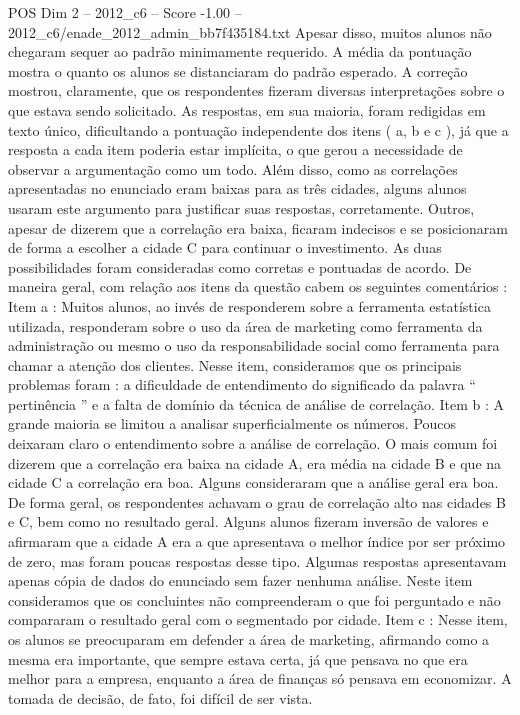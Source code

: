 \begin{textsample}{POS Dim 2 – 2012\_c6 – Score -1.00 – 2012\_c6/enade\_2012\_admin\_bb7f435184.txt}
Apesar disso, muitos alunos não chegaram sequer ao padrão minimamente requerido.
A média da pontuação mostra o quanto os alunos se distanciaram do padrão esperado.
A correção mostrou, claramente, que os respondentes fizeram diversas interpretações sobre o que estava sendo solicitado.
As respostas, em sua maioria, foram redigidas em texto único, dificultando a pontuação independente dos itens ( a, b e c ), já que a resposta a cada item poderia estar implícita, o que gerou a necessidade de observar a argumentação como um todo.
Além disso, como as correlações apresentadas no enunciado eram baixas para as três cidades, alguns alunos usaram este argumento para justificar suas respostas, corretamente.
Outros, apesar de dizerem que a correlação era baixa, ficaram indecisos e se posicionaram de forma a escolher a cidade C para continuar o investimento.
As duas possibilidades foram consideradas como corretas e pontuadas de acordo.
De maneira geral, com relação aos itens da questão cabem os seguintes comentários : Item a : Muitos alunos, ao invés de responderem sobre a ferramenta estatística utilizada, responderam sobre o uso da área de marketing como ferramenta da administração ou mesmo o uso da responsabilidade social como ferramenta para chamar a atenção dos clientes.
Nesse item, consideramos que os principais problemas foram : a dificuldade de entendimento do significado da palavra “ pertinência ” e a falta de domínio da técnica de análise de correlação.
Item b : A grande maioria se limitou a analisar superficialmente os números.
Poucos deixaram claro o entendimento sobre a análise de correlação.
O mais comum foi dizerem que a correlação era baixa na cidade A, era média na cidade B e que na cidade C a correlação era boa.
Alguns consideraram que a análise geral era boa.
De forma geral, os respondentes achavam o grau de correlação alto nas cidades B e C, bem como no resultado geral.
Alguns alunos fizeram inversão de valores e afirmaram que a cidade A era a que apresentava o melhor índice por ser próximo de zero, mas foram poucas respostas desse tipo.
Algumas respostas apresentavam apenas cópia de dados do enunciado sem fazer nenhuma análise.
Neste item consideramos que os concluintes não compreenderam o que foi perguntado e não compararam o resultado geral com o segmentado por cidade.
Item c : Nesse item, os alunos se preocuparam em defender a área de marketing, afirmando como a mesma era importante, que sempre estava certa, já que pensava no que era melhor para a empresa, enquanto a área de finanças só pensava em economizar.
A tomada de decisão, de fato, foi difícil de ser vista.

\end{textsample}
